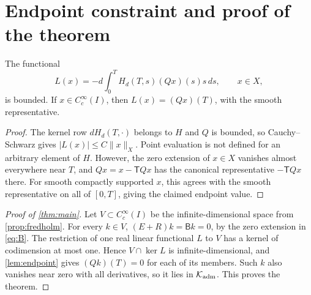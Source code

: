 \section{Endpoint constraint and proof of the theorem}\label{sec:endpoint}
\begin{lemma}\label{lem:endpoint}
The functional
\begin{equation}\label{eq:endpoint}
L(x)=-d\int_0^T H_d(T,s)(Qx)(s)s\,ds,\qquad x\in X,
\end{equation}
is bounded. If \(x\in C_c^\infty(I)\), then \(L(x)=(Qx)(T)\), with the smooth representative.
\end{lemma}
\begin{proof}
The kernel row \(dH_d(T,\cdot)\) belongs to \(H\) and \(Q\) is bounded, so Cauchy--Schwarz gives \(|L(x)|\le C\|x\|_X\). Point evaluation is not defined for an arbitrary element of \(H\). However, the zero extension of \(x\in X\) vanishes almost everywhere near \(T\), and \(Qx=x-\mathsf TQx\) has the canonical representative \(-\mathsf TQx\) there. For smooth compactly supported \(x\), this agrees with the smooth representative on all of \([0,T]\), giving the claimed endpoint value.
\end{proof}
\begin{proof}[Proof of \cref{thm:main}]
Let \(V\subset C_c^\infty(I)\) be the infinite-dimensional space from \cref{prop:fredholm}. For every \(k\in V\), \((E+R)k=\mathsf Bk=0\), by the zero extension in \eqref{eq:B}. The restriction of one real linear functional \(L\) to \(V\) has a kernel of codimension at most one. Hence \(V\cap\ker L\) is infinite-dimensional, and \cref{lem:endpoint} gives \((Qk)(T)=0\) for each of its members. Such \(k\) also vanishes near zero with all derivatives, so it lies in \(\mathcal K_{\rm adm}\). This proves the theorem.
\end{proof}

